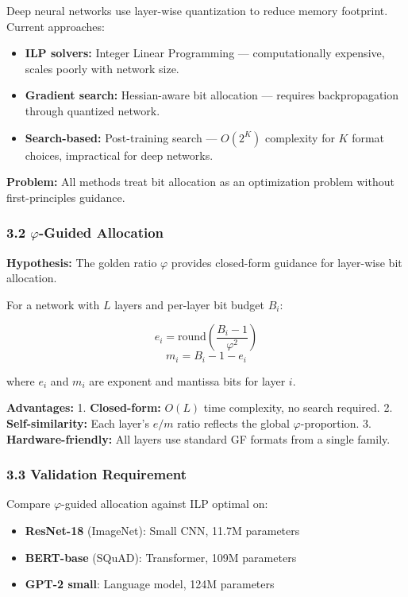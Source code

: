 Deep neural networks use layer-wise quantization to reduce memory
footprint. Current approaches:

\begin{itemize}
\tightlist
\item
  \textbf{ILP solvers:} Integer Linear Programming --- computationally
  expensive, scales poorly with network size.
\item
  \textbf{Gradient search:} Hessian-aware bit allocation --- requires
  backpropagation through quantized network.
\item
  \textbf{Search-based:} Post-training search --- \(O(2^K)\) complexity
  for \(K\) format choices, impractical for deep networks.
\end{itemize}

\textbf{Problem:} All methods treat bit allocation as an optimization
problem without first-principles guidance.

\subsubsection{\texorpdfstring{3.2 \(\varphi\)-Guided
Allocation}{3.2 \textbackslash varphi-Guided Allocation}}\label{varphi-guided-allocation}

\textbf{Hypothesis:} The golden ratio \(\varphi\) provides closed-form
guidance for layer-wise bit allocation.

For a network with \(L\) layers and per-layer bit budget \(B_i\):

\[e_i = \text{round}\left(\frac{B_i - 1}{\varphi^2}\right)\]
\[m_i = B_i - 1 - e_i\]

where \(e_i\) and \(m_i\) are exponent and mantissa bits for layer
\(i\).

\textbf{Advantages:} 1. \textbf{Closed-form:} \(O(L)\) time complexity,
no search required. 2. \textbf{Self-similarity:} Each layer's \(e/m\)
ratio reflects the global \(\varphi\)-proportion. 3.
\textbf{Hardware-friendly:} All layers use standard GF formats from a
single family.

\subsubsection{3.3 Validation Requirement}\label{validation-requirement}

Compare \(\varphi\)-guided allocation against ILP optimal on:

\begin{itemize}
\tightlist
\item
  \textbf{ResNet-18} (ImageNet): Small CNN, 11.7M parameters
\item
  \textbf{BERT-base} (SQuAD): Transformer, 109M parameters
\item
  \textbf{GPT-2 small}: Language model, 124M parameters
\end{itemize}

